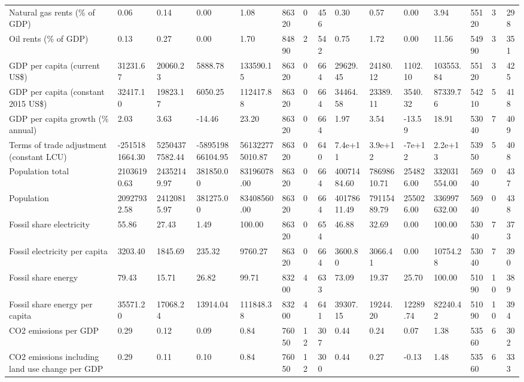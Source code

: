 \begin{longtable}{lllllllllllllll}
\addlinespace
Natural gas rents (\% of GDP) & 0.06 & 0.14 & 0.00 & 1.08 & 86320 & 0 & 456 & 0.30 & 0.57 & 0.00 & 3.94 & 55120 & 3 & 298\\
Oil rents (\% of GDP) & 0.13 & 0.27 & 0.00 & 1.70 & 84890 & 2 & 542 & 0.75 & 1.72 & 0.00 & 11.56 & 54990 & 3 & 351\\
GDP per capita (current US\$) & 31231.67 & 20060.23 & 5888.78 & 133590.15 & 86320 & 0 & 664 & 29629.45 & 24180.12 & 1102.10 & 103553.84 & 55120 & 3 & 425\\
GDP per capita (constant 2015 US\$) & 32417.10 & 19823.17 & 6050.25 & 112417.88 & 86320 & 0 & 664 & 34464.58 & 23389.11 & 3540.32 & 87339.76 & 54210 & 5 & 418\\
GDP per capita growth (\% annual) & 2.03 & 3.63 & -14.46 & 23.20 & 86320 & 0 & 664 & 1.97 & 3.54 & -13.59 & 18.91 & 53040 & 7 & 409\\
\addlinespace
Terms of trade adjustment (constant LCU) & -2515181664.30 & 52504377582.44 & -589519866104.95 & 561322775010.87 & 86320 & 0 & 640 & 7.4e+11 & 3.9e+12 & -7e+12 & 2.2e+13 & 53950 & 5 & 408\\
Population total & 21036190.63 & 24352149.97 & 381850.00 & 83196078.00 & 86320 & 0 & 664 & 40071484.60 & 78698610.71 & 254826.00 & 332031554.00 & 56940 & 0 & 437\\
Population & 20927932.58 & 24120815.97 & 381275.00 & 83408560.00 & 86320 & 0 & 664 & 40178611.49 & 79115489.79 & 255026.00 & 336997632.00 & 56940 & 0 & 438\\
Fossil share electricity & 55.86 & 27.43 & 1.49 & 100.00 & 86320 & 0 & 654 & 46.88 & 32.69 & 0.00 & 100.00 & 53040 & 7 & 373\\
Fossil electricity per capita & 3203.40 & 1845.69 & 235.32 & 9760.27 & 86320 & 0 & 664 & 3600.80 & 3066.41 & 0.00 & 10754.28 & 53040 & 7 & 390\\
\addlinespace
Fossil share energy & 79.43 & 15.71 & 26.82 & 99.71 & 83200 & 4 & 633 & 73.09 & 19.37 & 25.70 & 100.00 & 51090 & 10 & 389\\
Fossil share energy per capita & 35571.20 & 17068.24 & 13914.04 & 111848.38 & 83200 & 4 & 641 & 39307.15 & 19244.20 & 12289.74 & 82240.42 & 51090 & 10 & 394\\
CO2 emissions per GDP & 0.29 & 0.12 & 0.09 & 0.84 & 76050 & 12 & 307 & 0.44 & 0.24 & 0.07 & 1.38 & 53560 & 6 & 302\\
CO2 emissions including land use change per GDP & 0.29 & 0.11 & 0.10 & 0.84 & 76050 & 12 & 300 & 0.44 & 0.27 & -0.13 & 1.48 & 53560 & 6 & 333\\

\end{longtable}
